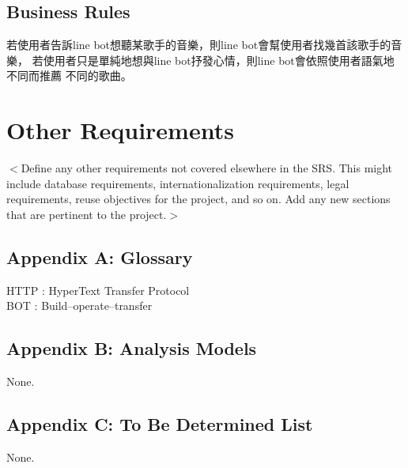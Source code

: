 \documentclass{scrreprt}
\begin{document}
\section{Business Rules}
\begin{CJK}{UTF8}{<font>}
若使用者告訴line bot想聽某歌手的音樂，則line bot會幫使用者找幾首該歌手的音樂，
若使用者只是單純地想與line bot抒發心情，則line bot會依照使用者語氣地不同而推薦
不同的歌曲。
\end{CJK}


\chapter{Other Requirements}
\begin{CJK}{UTF8}{<font>}
$<$Define any other requirements not covered elsewhere in the SRS. This might 
include database requirements, internationalization requirements, legal 
requirements, reuse objectives for the project, and so on. Add any new sections 
that are pertinent to the project.$>$
\end{CJK}

\section{Appendix A: Glossary}
\begin{CJK}{UTF8}{<font>}
HTTP : HyperText Transfer Protocol\\
BOT : Build–operate–transfer
\end{CJK}

\section{Appendix B: Analysis Models}
\begin{CJK}{UTF8}{<font>}
None.
\end{CJK}

\section{Appendix C: To Be Determined List}
\begin{CJK}{UTF8}{<font>}
None.
\end{CJK}
\end{document}
